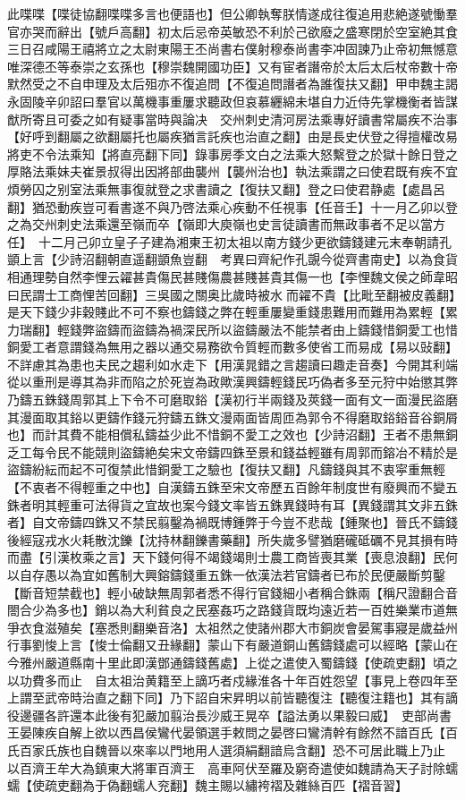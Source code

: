 此喋喋【喋徒協翻喋喋多言也便語也】但公卿執奪朕情遂成往復追用悲絶遂號慟羣官亦哭而辭出【號戶高翻】初太后忌帝英敏恐不利於己欲廢之盛寒閉於空室絶其食三日召咸陽王禧將立之太尉東陽王丕尚書右僕射穆泰尚書李冲固諫乃止帝初無憾意唯深德丕等泰崇之玄孫也【穆崇魏開國功臣】又有宦者譖帝於太后太后杖帝數十帝默然受之不自申理及太后殂亦不復追問【不復追問譖者為誰復扶又翻】甲申魏主謁永固陵辛卯詔曰羣官以萬機事重屢求聽政但哀慕纒綿未堪自力近侍先掌機衡者皆謀猷所寄且可委之如有疑事當時與論决　交州刺史清河房法乘專好讀書常屬疾不治事【好呼到翻屬之欲翻屬托也屬疾猶言託疾也治直之翻】由是長史伏登之得擅權改易將吏不令法乘知【將直亮翻下同】錄事房季文白之法乘大怒繫登之於獄十餘日登之厚賂法乘妹夫崔景叔得出因將部曲襲州【襲州治也】執法乘謂之曰使君既有疾不宜煩勞囚之别室法乘無事復就登之求書讀之【復扶又翻】登之曰使君静處【處昌呂翻】猶恐動疾豈可看書遂不與乃啓法乘心疾動不任視事【任音壬】十一月乙卯以登之為交州刺史法乘還至嶺而卒【嶺即大庾嶺也史言徒讀書而無政事者不足以當方任】　十二月己卯立皇子子建為湘東王初太祖以南方錢少更欲鑄錢建元末奉朝請孔顗上言【少詩沼翻朝直遥翻顗魚豈翻　考異曰齊紀作孔覬今從齊書南史】以為食貨相通理勢自然李悝云糴甚貴傷民甚賤傷農甚賤甚貴其傷一也【李悝魏文侯之師韋昭曰民謂士工商悝苦回翻】三吳國之關奥比歲時被水而糴不貴【比毗至翻被皮義翻】是天下錢少非穀賤此不可不察也鑄錢之弊在輕重屢變重錢患難用而難用為累輕【累力瑞翻】輕錢弊盜鑄而盜鑄為禍深民所以盜鑄嚴法不能禁者由上鑄錢惜銅愛工也惜銅愛工者意謂錢為無用之器以通交易務欲令質輕而數多使省工而易成【易以䜴翻】不詳慮其為患也夫民之趨利如水走下【用漢晁錯之言趨讀曰趣走音奏】今開其利端從以重刑是導其為非而陷之於死豈為政歟漢興鑄輕錢民巧偽者多至元狩中始懲其弊乃鑄五銖錢周郭其上下令不可磨取鋊【漢初行半兩錢及莢錢一面有文一面漫民盜磨其漫面取其鋊以更鑄作錢元狩鑄五銖文漫兩面皆周匝為郭令不得磨取鋊鋊音谷銅屑也】而計其費不能相償私鑄益少此不惜銅不愛工之效也【少詩沼翻】王者不患無銅乏工每令民不能競則盜鑄絶矣宋文帝鑄四銖至景和錢益輕雖有周郭而鎔冶不精於是盜鑄紛紜而起不可復禁此惜銅愛工之驗也【復扶又翻】凡鑄錢與其不衷寜重無輕【不衷者不得輕重之中也】自漢鑄五銖至宋文帝歷五百餘年制度世有廢興而不變五銖者明其輕重可法得貨之宜故也案今錢文率皆五銖異錢時有耳【異錢謂其文非五銖者】自文帝鑄四銖又不禁民翦鑿為禍既博鍾弊于今豈不悲哉【鍾聚也】晉氏不鑄錢後經寇戎水火耗散沈鑠【沈持林翻鑠書藥翻】所失歲多譬猶磨礲砥礪不見其損有時而盡【引漢枚乘之言】天下錢何得不竭錢竭則士農工商皆喪其業【喪息浪翻】民何以自存愚以為宜如舊制大興鎔鑄錢重五銖一依漢法若官鑄者已布於民便嚴斷剪鑿【斷音短禁截也】輕小破缺無周郭者悉不得行官錢細小者稱合銖兩【稱尺證翻合音閤合少為多也】銷以為大利貧良之民塞姦巧之路錢貨既均遠近若一百姓樂業市道無爭衣食滋殖矣【塞悉則翻樂音洛】太祖然之使諸州郡大市銅炭會晏駕事寢是歲益州行事劉悛上言【悛士倫翻又丑緣翻】蒙山下有嚴道銅山舊鑄錢處可以經略【蒙山在今雅州嚴道縣南十里此即漢鄧通鑄錢舊處】上從之遣使入蜀鑄錢【使疏吏翻】頃之以功費多而止　自太祖治黄籍至上謫巧者戍緣淮各十年百姓怨望【事見上卷四年至上謂至武帝時治直之翻下同】乃下詔自宋昇明以前皆聽復注【聽復注籍也】其有謫役邊疆各許還本此後有犯嚴加翦治長沙威王晃卒【謚法勇以果毅曰威】　吏部尚書王晏陳疾自解上欲以西昌侯鸞代晏領選手敕問之晏啓曰鸞清幹有餘然不諳百氏【百氏百家氏族也自魏晉以來率以門地用人選須絹翻諳烏含翻】恐不可居此職上乃止　以百濟王牟大為鎮東大將軍百濟王　高車阿伏至羅及窮奇遣使如魏請為天子討除蠕蠕【使疏吏翻為于偽翻蠕人兖翻】魏主賜以繡袴褶及雜絲百匹【褶音習】

